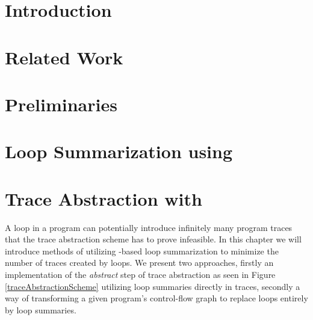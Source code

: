\documentclass[11pt,
a4paper,
parskip=half, %
BCOR=10mm, %
ngerman, english
]{scrbook}
\begin{document}
	\setlength{\abovedisplayskip}{0.25cm}
	\setlength{\belowdisplayskip}{0.25cm}
	\setlength{\abovedisplayshortskip}{0.25cm}
	\setlength{\belowdisplayshortskip}{0.25cm}
	 \raggedbottom
\newcommand{\HorizontalLine}{\rule{\textwidth}{0.4mm}}


\pagebreak

\frontmatter

\pagebreak



\tableofcontents
\pagebreak

\mainmatter
\chapter{Introduction}
\label{intro}


\chapter{Related Work}
\label{relWork}

\pagebreak

\chapter{Preliminaries}
\label{background}


\chapter{Loop Summarization using \qvasr}
\label{qvasr}


\begin{comment}
	\section{Extension to \qvasrs}
	\label{qvasrs}
	
\end{comment}

\chapter{Trace Abstraction with \qvasr}
A loop in a program can potentially introduce infinitely many program traces that the trace abstraction scheme has to prove infeasible. In this chapter we will introduce methods of utilizing \qvasr-based loop summarization to minimize the number of traces created by loops. We present two approaches, firstly an implementation of the \textsl{abstract} step of trace abstraction as seen in Figure \ref{traceAbstractionScheme} utilizing loop summaries directly in traces, secondly a way of transforming a given program's control-flow graph to replace loops entirely by loop summaries.
\label{qvasrAbstracion}
\end{document}

